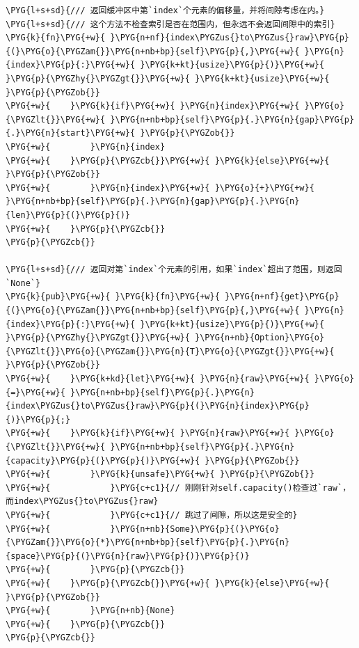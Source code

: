 \begin{Verbatim}[commandchars=\\\{\},breaklines=true,breakanywhere=true,fontsize=\codefont,xleftmargin=17bp]
\PYG{l+s+sd}{/// 返回缓冲区中第`index`个元素的偏移量，并将间隙考虑在内。}
\PYG{l+s+sd}{/// 这个方法不检查索引是否在范围内，但永远不会返回间隙中的索引}
\PYG{k}{fn}\PYG{+w}{ }\PYG{n+nf}{index\PYGZus{}to\PYGZus{}raw}\PYG{p}{(}\PYG{o}{\PYGZam{}}\PYG{n+nb+bp}{self}\PYG{p}{,}\PYG{+w}{ }\PYG{n}{index}\PYG{p}{:}\PYG{+w}{ }\PYG{k+kt}{usize}\PYG{p}{)}\PYG{+w}{ }\PYG{p}{\PYGZhy{}\PYGZgt{}}\PYG{+w}{ }\PYG{k+kt}{usize}\PYG{+w}{ }\PYG{p}{\PYGZob{}}
\PYG{+w}{    }\PYG{k}{if}\PYG{+w}{ }\PYG{n}{index}\PYG{+w}{ }\PYG{o}{\PYGZlt{}}\PYG{+w}{ }\PYG{n+nb+bp}{self}\PYG{p}{.}\PYG{n}{gap}\PYG{p}{.}\PYG{n}{start}\PYG{+w}{ }\PYG{p}{\PYGZob{}}
\PYG{+w}{        }\PYG{n}{index}
\PYG{+w}{    }\PYG{p}{\PYGZcb{}}\PYG{+w}{ }\PYG{k}{else}\PYG{+w}{ }\PYG{p}{\PYGZob{}}
\PYG{+w}{        }\PYG{n}{index}\PYG{+w}{ }\PYG{o}{+}\PYG{+w}{ }\PYG{n+nb+bp}{self}\PYG{p}{.}\PYG{n}{gap}\PYG{p}{.}\PYG{n}{len}\PYG{p}{(}\PYG{p}{)}
\PYG{+w}{    }\PYG{p}{\PYGZcb{}}
\PYG{p}{\PYGZcb{}}

\PYG{l+s+sd}{/// 返回对第`index`个元素的引用，如果`index`超出了范围，则返回`None`}
\PYG{k}{pub}\PYG{+w}{ }\PYG{k}{fn}\PYG{+w}{ }\PYG{n+nf}{get}\PYG{p}{(}\PYG{o}{\PYGZam{}}\PYG{n+nb+bp}{self}\PYG{p}{,}\PYG{+w}{ }\PYG{n}{index}\PYG{p}{:}\PYG{+w}{ }\PYG{k+kt}{usize}\PYG{p}{)}\PYG{+w}{ }\PYG{p}{\PYGZhy{}\PYGZgt{}}\PYG{+w}{ }\PYG{n+nb}{Option}\PYG{o}{\PYGZlt{}}\PYG{o}{\PYGZam{}}\PYG{n}{T}\PYG{o}{\PYGZgt{}}\PYG{+w}{ }\PYG{p}{\PYGZob{}}
\PYG{+w}{    }\PYG{k+kd}{let}\PYG{+w}{ }\PYG{n}{raw}\PYG{+w}{ }\PYG{o}{=}\PYG{+w}{ }\PYG{n+nb+bp}{self}\PYG{p}{.}\PYG{n}{index\PYGZus{}to\PYGZus{}raw}\PYG{p}{(}\PYG{n}{index}\PYG{p}{)}\PYG{p}{;}
\PYG{+w}{    }\PYG{k}{if}\PYG{+w}{ }\PYG{n}{raw}\PYG{+w}{ }\PYG{o}{\PYGZlt{}}\PYG{+w}{ }\PYG{n+nb+bp}{self}\PYG{p}{.}\PYG{n}{capacity}\PYG{p}{(}\PYG{p}{)}\PYG{+w}{ }\PYG{p}{\PYGZob{}}
\PYG{+w}{        }\PYG{k}{unsafe}\PYG{+w}{ }\PYG{p}{\PYGZob{}}
\PYG{+w}{            }\PYG{c+c1}{// 刚刚针对self.capacity()检查过`raw`，而index\PYGZus{}to\PYGZus{}raw}
\PYG{+w}{            }\PYG{c+c1}{// 跳过了间隙，所以这是安全的}
\PYG{+w}{            }\PYG{n+nb}{Some}\PYG{p}{(}\PYG{o}{\PYGZam{}}\PYG{o}{*}\PYG{n+nb+bp}{self}\PYG{p}{.}\PYG{n}{space}\PYG{p}{(}\PYG{n}{raw}\PYG{p}{)}\PYG{p}{)}
\PYG{+w}{        }\PYG{p}{\PYGZcb{}}
\PYG{+w}{    }\PYG{p}{\PYGZcb{}}\PYG{+w}{ }\PYG{k}{else}\PYG{+w}{ }\PYG{p}{\PYGZob{}}
\PYG{+w}{        }\PYG{n+nb}{None}
\PYG{+w}{    }\PYG{p}{\PYGZcb{}}
\PYG{p}{\PYGZcb{}}
\end{Verbatim}


